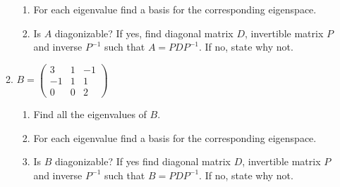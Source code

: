 \documentclass[12pt]{exam}
\begin{document}
\begin{enumerate}
\begin{enumerate}
\begin{enumerate}
\item For each eigenvalue  find a basis for the corresponding eigenspace.  

\item Is $A$ diagonizable? If yes, find diagonal matrix $D$, invertible matrix $P$ and inverse $P^{-1}$ such that $A=PDP^{-1}$. If no, state why not.

\end{enumerate}
\item $B=\left(\begin{array}{rrr}
   3  & 1 & -1\\
  -1  & 1 &  1\\
   0  & 0 &  2
\end{array}\right)$
\begin{enumerate}
\item Find all the eigenvalues of $B$.

\item For each eigenvalue  find a basis for the corresponding eigenspace.  

\item Is $B$ diagonizable? If yes find diagonal matrix $D$, invertible matrix $P$ and inverse $P^{-1}$ such that $B=PDP^{-1}$. If no, state why not.

\end{enumerate}
\end{enumerate}
\end{enumerate}
\end{document}
